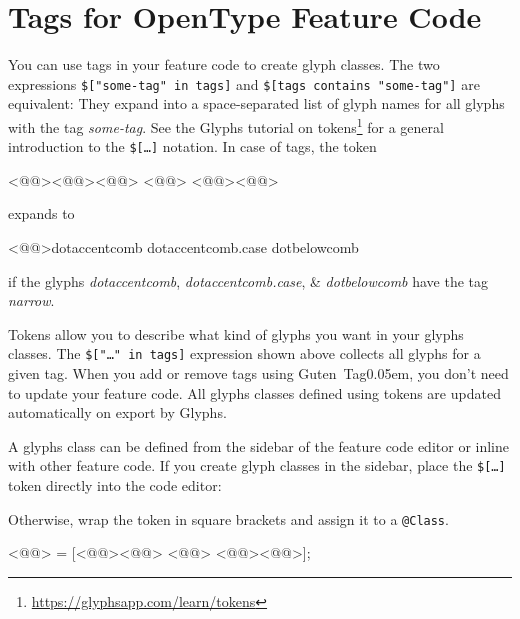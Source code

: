 \section{Tags for OpenType Feature Code}%
\label{sec:tags_for_opentype_feature_code}

You can use tags in your feature code to create glyph classes.
The two expressions \texttt{\$["some-tag" in tags]} and \texttt{\$[tags contains "some-tag"]} are equivalent:
They expand into a space-separated list of glyph names for all glyphs with the tag \emph{some-tag}.
See the Glyphs tutorial on tokens\footnote{\url{https://glyphsapp.com/learn/tokens}} for a general introduction to the \texttt{\$[…]} notation.
In case of tags, the token

\begin{RichListing}
<@\hspace{\parindent}@><@\Token{\$[}@><@@> <@@> <@@><@\Token{]}@>
\end{RichListing}

\noindent expands to

\begin{RichListing}
<@\hspace{\parindent}@>dotaccentcomb dotaccentcomb.case dotbelowcomb
\end{RichListing}

\noindent if the glyphs \emph{dotaccentcomb}, \emph{dotaccentcomb.case}, \& \emph{dotbelowcomb} have the tag \emph{narrow}.

Tokens allow you to describe what kind of glyphs you want in your glyphs classes.
The \texttt{\$["…" in tags]} expression shown above collects all glyphs for a given tag.
When you add or remove tags using Guten~Tag\kern0.05em, you don’t need to update your feature code.
All glyphs classes defined using tokens are updated automatically on export by Glyphs.

A glyphs class can be defined from the sidebar of the feature code editor or inline with other feature code.
If you create glyph classes in the sidebar, place the \texttt{\$[…]} token directly into the code editor:

\bigbreak\noindent{}

\noindent Otherwise, wrap the token in square brackets and assign it to a \texttt{@Class}.

\begin{RichListing}
<@@> = [<@\Token{\$[}@><@@> <@@> <@@><@\Token{]}@>];
\end{RichListing}

